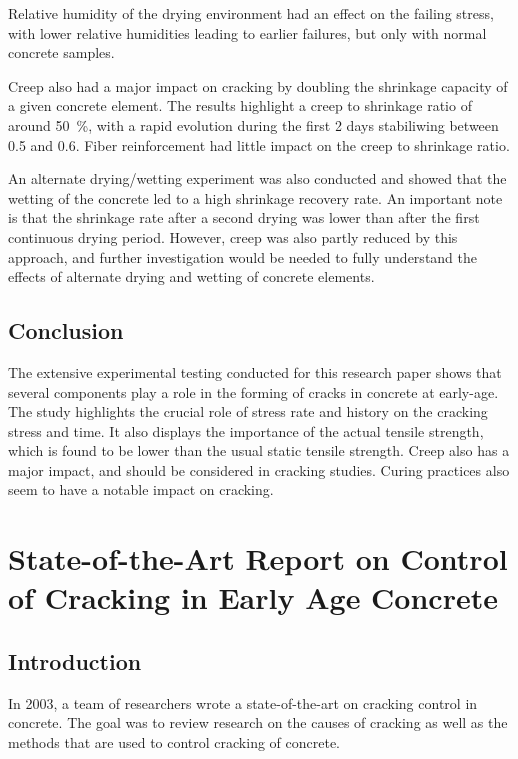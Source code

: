 \documentclass{report}
\begin{document}
Relative humidity of the drying environment had an effect on the failing
stress, with lower relative humidities leading to earlier failures, but only
with normal concrete samples.

Creep also had a major impact on cracking by doubling the shrinkage capacity of
a given concrete element. The results highlight a creep to shrinkage ratio of
around \SI{50}{\percent}, with a rapid evolution during the first 2 days
stabiliwing between \num{0.5} and \num{.6}. Fiber reinforcement had little
impact on the creep to shrinkage ratio.

An alternate drying/wetting experiment was also conducted and showed that the
wetting of the concrete led to a high shrinkage recovery rate. An important
note is that the shrinkage rate after a second drying was lower than after the
first continuous drying period. However, creep was also partly reduced by this
approach, and further investigation would be needed to fully understand the
effects of alternate drying and wetting of concrete elements.

\subsection{Conclusion}
The extensive experimental testing conducted for this research paper shows that
several components play a role in the forming of cracks in concrete at
early-age. The study highlights the crucial role of stress rate and history on
the cracking stress and time. It also displays the importance of the actual
tensile strength, which is found to be lower than the usual static tensile
strength. Creep also has a major impact, and should be considered in cracking
studies. Curing practices also seem to have a notable impact on cracking.

\section[State-of-the-Art Report on Control of Cracking in Early Age Concrete]
{State-of-the-Art Report on Control of Cracking in Early Age Concrete \cite{soa}}

\subsection{Introduction}
In 2003, a team of researchers wrote a state-of-the-art on cracking control in
concrete. The goal was to review research on the causes of cracking as well as
the methods that are used to control cracking of concrete.
\end{document}
